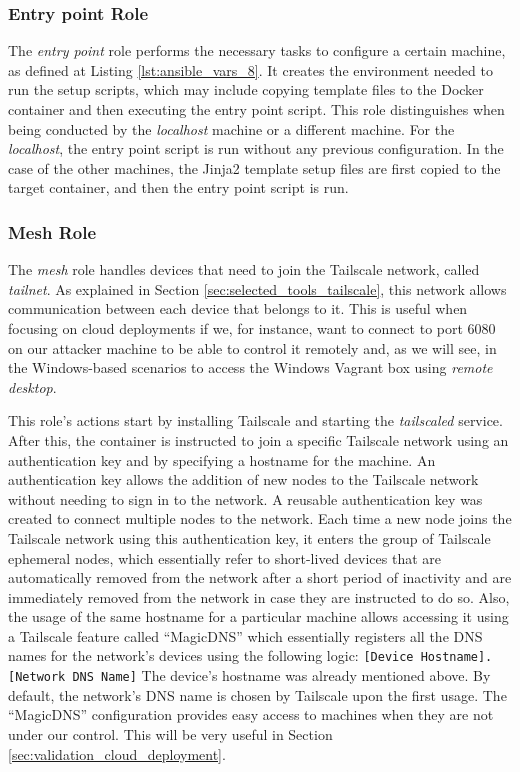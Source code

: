 \subsubsection{Entry point Role} \label{sec:ansible_entrypoint_role}

The \textit{entry point} role performs the necessary tasks to configure a certain machine, as defined at Listing \ref{lst:ansible_vars_8}. It creates the environment needed to run the setup scripts, which may include copying template files to the Docker container and then executing the entry point script. This role distinguishes when being conducted by the \textit{localhost} machine or a different machine. For the \textit{localhost}, the entry point script is run without any previous configuration. In the case of the other machines, the Jinja2 template setup files are first copied to the target container, and then the entry point script is run.

\subsubsection{Mesh Role} \label{sec:ansible_mesh_role}

The \textit{mesh} role handles devices that need to join the Tailscale network, called \textit{tailnet}. As explained in Section \ref{sec:selected_tools_tailscale}, this network allows communication between each device that belongs to it. This is useful when focusing on cloud deployments if we, for instance, want to connect to port 6080 on our attacker machine to be able to control it remotely and, as we will see, in the Windows-based scenarios to access the Windows Vagrant box using \textit{remote desktop}. 

This role's actions start by installing Tailscale and starting the \textit{tailscaled} service. After this, the container is instructed to join a specific Tailscale network using an authentication key and by specifying a hostname for the machine. An authentication key allows the addition of new nodes to the Tailscale network without needing to sign in to the network. A reusable authentication key was created to connect multiple nodes to the network. Each time a new node joins the Tailscale network using this authentication key, it enters the group of Tailscale ephemeral nodes, which essentially refer to short-lived devices that are automatically removed from the network after a short period of inactivity and are immediately removed from the network in case they are instructed to do so. Also, the usage of the same hostname for a particular machine allows accessing it using a Tailscale feature called ``MagicDNS'' which essentially registers all the DNS names for the network's devices using the following logic: \texttt{[Device Hostname].[Network DNS Name]}
The device's hostname was already mentioned above. By default, the network's DNS name is chosen by Tailscale upon the first usage. The ``MagicDNS'' configuration provides easy access to machines when they are not under our control. This will be very useful in Section \ref{sec:validation_cloud_deployment}.

